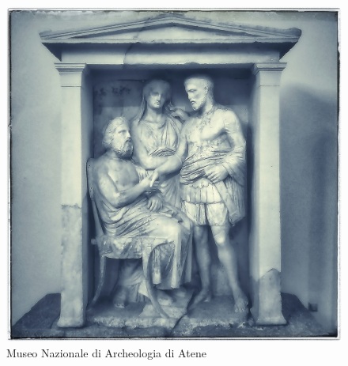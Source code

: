 \documentclass[nols]{tufte-handout}
\begin{document}
\begin{figure}[!b]
  \includegraphics{thumb-lesson_V.jpeg}
  \caption{Museo Nazionale di Archeologia di Atene}
  \label{fig:textfig}
\end{figure}


\end{document}
